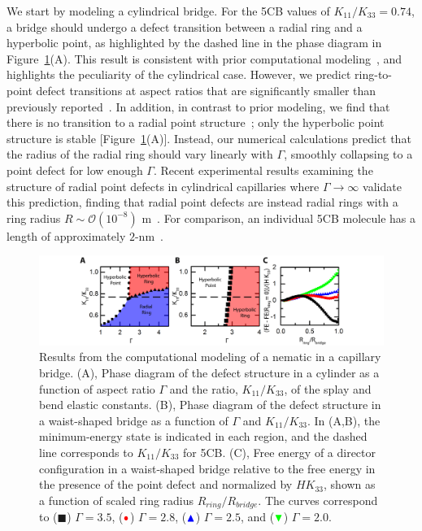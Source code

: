 We start by modeling a cylindrical bridge.
For the 5CB values of $K_{11}/K_{33} = 0.74$, a bridge should undergo a defect transition between a radial ring and a hyperbolic point, as highlighted by the dashed line in the phase diagram in Figure~\ref{f:5-Calcs}(A).
This result is consistent with prior computational modeling~\cite{RN144}, and highlights the peculiarity of the cylindrical case.
However, we predict ring-to-point defect transitions at aspect ratios that are significantly smaller than previously reported~\cite{RN144}.
In addition, in contrast to prior modeling, we find that there is no transition to a radial point structure~\cite{RN144}; only the hyperbolic point structure is stable [Figure~\ref{f:5-Calcs}(A)].
Instead, our numerical calculations predict that the radius of the radial ring should vary linearly with $\Gamma$, smoothly collapsing to a point defect for low enough $\Gamma$.
Recent experimental results examining the structure of radial point defects in cylindrical capillaries where $\Gamma \rightarrow \infty$ validate this prediction, finding that radial point defects are instead radial rings with a ring radius $R \sim \mathcal{O}(10^{-8})$ m~\cite{RN280}. For comparison, an individual 5CB molecule has a length of approximately $2$-nm~\cite{RN33}.
\begin{figure}
  \centering
  \includegraphics{figures/C5/Ch5-Figs_Calcs.png}
  \caption{Results from the computational modeling of a nematic in a capillary bridge.
  (A), Phase diagram of the defect structure in a cylinder as a function of aspect ratio $\Gamma$ and the ratio, $K_{11}/K_{33}$, of the splay and bend elastic constants.
  (B), Phase diagram of the defect structure in a waist-shaped bridge as a function of $\Gamma$ and $K_{11}/K_{33}$.
  In (A,B), the minimum-energy state is indicated in each region, and the dashed line corresponds to $K_{11} / K_{33}$ for 5CB.\@
  (C), Free energy of a director configuration in a waist-shaped bridge relative to the free energy in the presence of the point defect and normalized by $H K_{33}$, shown as a function of scaled ring radius $R_{ring}/R_{bridge}$.
  The curves correspond to (${\blacksquare}$) $\Gamma = 3.5$, (${\color{red} \bullet}$) $\Gamma = 2.8$, (${\color{blue} \blacktriangle}$) $\Gamma = 2.5$, and (${\color{green} \blacktriangledown}$) $\Gamma = 2.0$.}\label{f:5-Calcs}
\end{figure}

